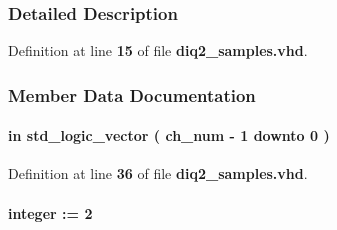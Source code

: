 \subsubsection{Detailed Description}


Definition at line {\bf 15} of file {\bf diq2\+\_\+samples.\+vhd}.



\subsubsection{Member Data Documentation}
\paragraph[{ch\+\_\+en}]{ {\bfseries \textcolor{keywordflow}{in}\textcolor{vhdlchar}{ }} {\bfseries \textcolor{comment}{std\+\_\+logic\+\_\+vector}\textcolor{vhdlchar}{ }\textcolor{vhdlchar}{(}\textcolor{vhdlchar}{ }\textcolor{vhdlchar}{ }\textcolor{vhdlchar}{ }\textcolor{vhdlchar}{ }{\bfseries {\bf ch\+\_\+num}} \textcolor{vhdlchar}{-\/}\textcolor{vhdlchar}{ } \textcolor{vhdldigit}{1} \textcolor{vhdlchar}{ }\textcolor{keywordflow}{downto}\textcolor{vhdlchar}{ }\textcolor{vhdlchar}{ } \textcolor{vhdldigit}{0} \textcolor{vhdlchar}{ }\textcolor{vhdlchar}{)}\textcolor{vhdlchar}{ }} \hspace{0.3cm}{\ttfamily [Port]}}\label{classdiq2__samples_ac6f35edba31976028a83a821781fcf1a}


Definition at line {\bf 36} of file {\bf diq2\+\_\+samples.\+vhd}.

\paragraph[{ch\+\_\+num}]{ {\bfseries \textcolor{vhdlchar}{ }} {\bfseries \textcolor{comment}{integer}\textcolor{vhdlchar}{ }\textcolor{vhdlchar}{ }\textcolor{vhdlchar}{\+:}\textcolor{vhdlchar}{=}\textcolor{vhdlchar}{ }\textcolor{vhdlchar}{ } \textcolor{vhdldigit}{2} \textcolor{vhdlchar}{ }} \hspace{0.3cm}{\ttfamily [Generic]}}\label{classdiq2__samples_a56fecce078eed41e08a459e80314b761}


